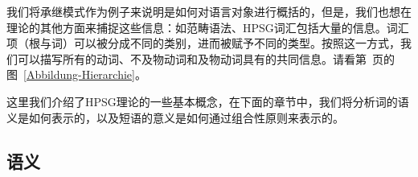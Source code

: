 我们将承继模式作为例子来说明是如何对语言对象进行概括的，但是，我们也想在理论的其他方面来捕捉这些信息：如范畴语法\indexcxg 、HPSG词汇包括大量的信息。词汇项（根与词）可以被分成不同的类别，进而被赋予不同的类型。按照这一方式，我们可以描写所有的动词、不及物动词和及物动词具有的共同信息。请看第~\pageref{Abbildung-Hierarchie}页的图~\ref{Abbildung-Hierarchie}。

这里我们介绍了HPSG理论的一些基本概念，在下面的章节中，我们将分析词的语义是如何表示的，以及短语的意义是如何通过组合性原则来表示的。

\subsection{语义}
\label{Abschnitt-HPSG-Semantik}

